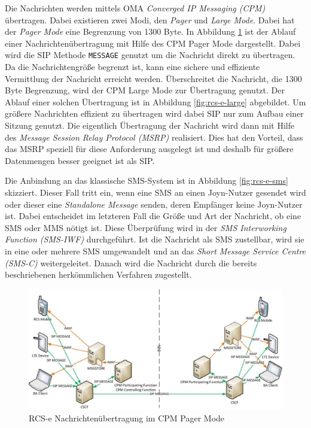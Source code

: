 \documentclass[german,12pt,a4paper]{article}
\begin{document}
    Die Nachrichten werden mittels OMA \textit{Converged IP Messaging (CPM)} übertragen. Dabei
    existieren zwei Modi, den \textit{Pager} und \textit{Large Mode}. Dabei hat der
    \textit{Pager Mode} eine Begrenzung von 1300 Byte. In Abbildung \ref{fig:rcs-e-pager} ist
    der Ablauf einer Nachrichtenübertragung mit Hilfe des CPM Pager Mode dargestellt. Dabei wird
    die SIP Methode \texttt{MESSAGE} genutzt um die Nachricht direkt zu übertragen. Da die
    Nachrichtengröße begrenzt ist, kann eine sichere und effiziente Vermittlung der Nachricht
    erreicht werden. Überschreitet die Nachricht, die 1300 Byte Begrenzung, wird der CPM
    Large Mode zur Übertragung genutzt. Der Ablauf einer solchen Übertragung ist in
    Abbildung \ref{fig:rcs-e-large} abgebildet. Um größere Nachrichten effizient zu übertragen
    wird dabei SIP nur zum Aufbau einer Sitzung genutzt. Die eigentlich Übertragung der Nachricht
    wird dann mit Hilfe des \textit{Message Session Relay Protocol (MSRP)} realisiert. Dies
    hat den Vorteil, dass das MSRP speziell für diese Anforderung ausgelegt ist und deshalb
    für größere Datenmengen besser geeignet ist als SIP.

    Die Anbindung an das klassische SMS-System ist in Abbildung \ref{fig:rcs-e-sms} skizziert.
    Dieser Fall tritt ein, wenn eine SMS an einen Joyn-Nutzer gesendet wird oder dieser eine
    \textit{Standalone Message} senden, deren Empfänger keine Joyn-Nutzer ist. Dabei
    entscheidet im letzteren Fall die Größe und Art der Nachricht, ob eine SMS oder MMS nötigt
    ist. Diese Überprüfung wird in der \textit{SMS Interworking Function (SMS-IWF)} durchgeführt.
    Ist die Nachricht als SMS zustellbar, wird sie in eine oder mehrere SMS umgewandelt und an das
    \textit{Short Message Service Centre (SMS-C)} weitergeleitet. Danach wird die Nachricht durch
    die bereits beschriebenen herkömmlichen Verfahren zugestellt.

 \begin{figure}
     \centering
     \includegraphics[width=\textwidth]{img/rcs-e-pager}
     \caption{RCS-e Nachrichtenübertragung im CPM Pager Mode \cite{rcs:spec}}
     \label{fig:rcs-e-pager}
 \end{figure}
\end{document}
